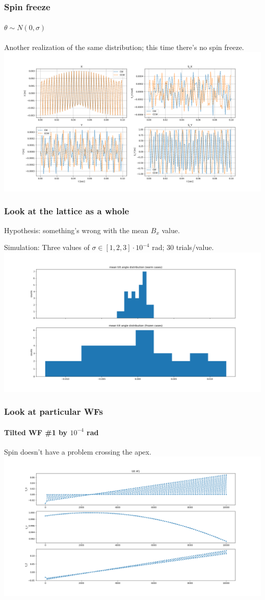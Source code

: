 \documentclass[pdf]{beamer}
\begin{document}
\begin{frame}\frametitle{Spin freeze}
	\framesubtitle{$\theta\sim N(0,\sigma)$}
	 Another realization of the same distribution; this time there's no spin freeze.
	\centering
	\includegraphics[scale=.3]{freeze/CALIB_MEAN_ZERO_SIGMA_ONE_PYGAUSS}
\end{frame}
\begin{frame}\frametitle{Look at the lattice as a whole}
	Hypothesis: something's wrong with the mean $B_x$ value.
	
	Simulation: Three values of $\sigma \in [1, 2, 3]\cdot 10^{-4}$ rad; 30 trials/value.
	\centering
	\includegraphics[scale=.3]{freeze/MEAN_TILT_ANGLE_WARM_FROZEN_HIST}
\end{frame}
\begin{frame}\frametitle{Look at particular WFs}
\framesubtitle{Tilted WF \#1 by $10^{-4}$ rad}
	Spin doesn't have a problem crossing the apex.
	\centering
	\includegraphics[scale=.3]{freeze/TITLS_TEST_1stWF_1e-4rad}
\end{frame}
\end{document}
